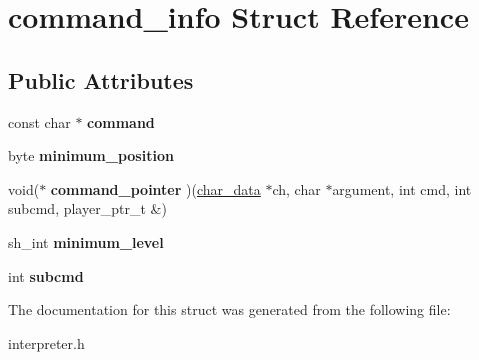 \hypertarget{structcommand__info}{}\section{command\+\_\+info Struct Reference}
\label{structcommand__info}
\subsection*{Public Attributes}
\begin{DoxyCompactItemize}
\item 
\mbox{\label{structcommand__info_a8a994971b22097cf898f70880719c74b}} 
const char $\ast$ {\bfseries command}
\item 
\mbox{\label{structcommand__info_a48bdb7bc234d2b5b3865a6f9ed644cb6}} 
byte {\bfseries minimum\+\_\+position}
\item 
\mbox{\label{structcommand__info_aab52153a9d132de5cf359c59239c397d}} 
void($\ast$ {\bfseries command\+\_\+pointer} )(\hyperlink{structchar__data}{char\+\_\+data} $\ast$ch, char $\ast$argument, int cmd, int subcmd, player\+\_\+ptr\+\_\+t \&)
\item 
\mbox{\label{structcommand__info_a2d99235ba76adff13fbc889e65fb3a88}} 
sh\+\_\+int {\bfseries minimum\+\_\+level}
\item 
\mbox{\label{structcommand__info_aa18d361d28c9db39948dc00bf3203c09}} 
int {\bfseries subcmd}
\end{DoxyCompactItemize}


The documentation for this struct was generated from the following file\+:\begin{DoxyCompactItemize}
\item 
interpreter.\+h\end{DoxyCompactItemize}

